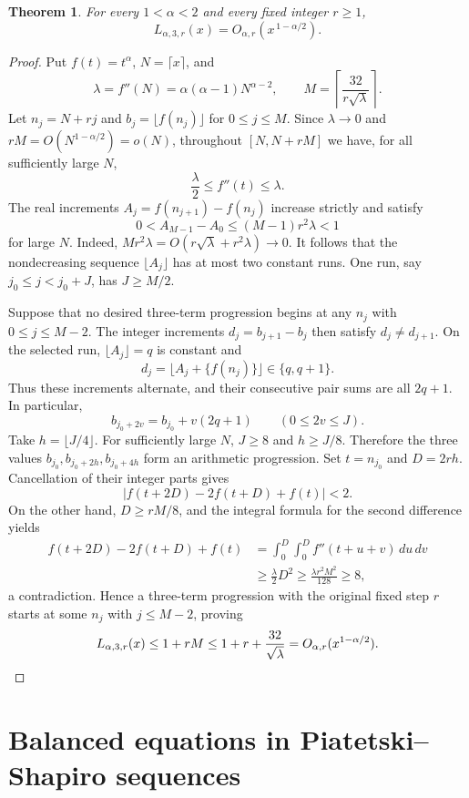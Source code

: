 \documentclass[11pt,a4paper]{article}
\newtheorem{theorem}{Theorem}[section]
\theoremstyle{definition}
\theoremstyle{remark}
\numberwithin{equation}{section}
\begin{document}
\begin{theorem}\label{sur:thm:ps-waiting}
For every $1<\alpha<2$ and every fixed integer $r\geq1$,
\[
 L_{\alpha,3,r}(x)=O_{\alpha,r}(x^{\,1-\alpha/2}).
\]
\end{theorem}

\begin{proof}
Put $f(t)=t^\alpha$, $N=\lceil x\rceil$, and
\[
 \lambda=f''(N)=\alpha(\alpha-1)N^{\alpha-2},\qquad
 M=\left\lceil\frac{32}{r\sqrt\lambda}\right\rceil.
\]
Let $n_j=N+rj$ and $b_j=\lfloor f(n_j)\rfloor$ for $0\leq j\leq M$.
Since $\lambda\to0$ and $rM=O(N^{1-\alpha/2})=o(N)$, throughout
$[N,N+rM]$ we have, for all sufficiently large $N$,
\[
 \frac{\lambda}{2}\leq f''(t)\leq\lambda.
\]
The real increments $A_j=f(n_{j+1})-f(n_j)$ increase strictly and
satisfy
\[
 0<A_{M-1}-A_0\leq(M-1)r^2\lambda<1
\]
for large $N$. Indeed, $Mr^2\lambda=O(r\sqrt\lambda+r^2\lambda)\to0$.
It follows that the nondecreasing sequence $\lfloor A_j\rfloor$ has
at most two constant runs. One run, say $j_0\leq j<j_0+J$, has
$J\geq M/2$.

Suppose that no desired three-term progression begins at any $n_j$
with $0\leq j\leq M-2$. The integer increments
$d_j=b_{j+1}-b_j$ then satisfy $d_j\ne d_{j+1}$. On the selected run,
$\lfloor A_j\rfloor=q$ is constant and
\[
 d_j=\lfloor A_j+\{f(n_j)\}\rfloor\in\{q,q+1\}.
\]
Thus these increments alternate, and their consecutive pair sums
are all $2q+1$. In particular,
\[
 b_{j_0+2v}=b_{j_0}+v(2q+1)\qquad(0\leq2v\leq J).
\]
Take $h=\lfloor J/4\rfloor$. For sufficiently large $N$, $J\geq8$
and $h\geq J/8$. Therefore the three values
$b_{j_0},b_{j_0+2h},b_{j_0+4h}$ form an arithmetic progression.
Set $t=n_{j_0}$ and $D=2rh$. Cancellation of their integer parts gives
\[
 |f(t+2D)-2f(t+D)+f(t)|<2.
\]
On the other hand, $D\geq rM/8$, and the integral formula for the
second difference yields
\begin{align*}
 f(t+2D)-2f(t+D)+f(t)
 &=\int_0^D\int_0^D f''(t+u+v)\,du\,dv\\
 &\geq\frac{\lambda}{2}D^2
 \geq\frac{\lambda r^2M^2}{128}\geq8,
\end{align*}
a contradiction. Hence a three-term progression with the original
fixed step $r$ starts at some $n_j$ with $j\leq M-2$, proving
\[
 L_{\alpha,3,r}(x)\leq1+rM
 \leq1+r+\frac{32}{\sqrt\lambda}
 =O_{\alpha,r}(x^{1-\alpha/2}).\qedhere
\]
\end{proof}


\section{Balanced equations in Piatetski--Shapiro sequences}
\end{document}
